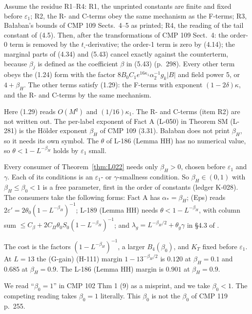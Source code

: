 \begin{theorem}\label{thm:L022}
Assume the residue R1--R4: R1, the unprinted constants are finite and fixed before $\varepsilon_1$; R2, the R- and C-terms obey the same mechanism as the F-terms; R3, Ba{\l}aban's bounds of CMP 109 Sects.~4--5 as printed; R4, the reading of the tail constant of (4.5). Then, after the transformations of CMP 109 Sect.~4: the order-0 term is removed by the $t_\square$-derivative; the order-1 term is zero by (4.14); the marginal parts of (4.34) and (5.43) cancel exactly against the counterterm, because $\beta_j$ is defined as the coefficient $\beta$ in (5.43) (p.~298). Every other term obeys the (1.24) form with the factor $8B_0C_1e^{16\kappa_1}\alpha_2^{-1}g_k|B|$ and field power 5, or $4+\beta_H$. The other terms satisfy (1.29): the F-terms with exponent $(1-2\delta)\kappa$, and the R- and C-terms by the same mechanism.
\end{theorem}
Here (1.29) reads $O(M^q)$ and $(1/16)\kappa_1$. The R- and C-terms (item R2) are not written out. The per-label exponent of Fact A (L-050) in Theorem SM (L-281) is the H\"older exponent $\beta_H$ of CMP 109 (3.31). Ba{\l}aban does not print $\beta_H$, so it needs its own symbol. The $\theta$ of L-186 (Lemma HH) has no numerical value, so $\theta<1-L^{-\beta_H}$ holds by $\varepsilon_1$ small.

\begin{proposition}\label{src:GGAIN-BETAH}
Every consumer of Theorem~\ref{thm:L022} needs only $\beta_H>0$, chosen before $\varepsilon_1$ and $\gamma$. Each of its conditions is an $\varepsilon_1$- or $\gamma$-smallness condition. So $\beta_H\in(0,1)$ with $\beta_H\le\beta_0<1$ is a free parameter, first in the order of constants (ledger K-028). The consumers take the following forms: Fact A has $\alpha_*=\beta_H$; (Eps) reads $2\varepsilon'=2\theta_0(1-L^{-\beta_H})^{-1}$; L-189 (Lemma HH) needs $\theta<1-L^{-\beta_H}$, with column sum $\le C_\beta+2C_\Pi\theta_0S_0(1-L^{-\beta_H})^{-1}$; and $\lambda_g=L^{-\beta_H/2}+\theta_g\gamma$ in \S4.3 of .
\end{proposition}
The cost is the factors $(1-L^{-\beta_H})^{-1}$, a larger $B_4(\beta_0)$, and $K_T$ fixed before $\varepsilon_1$. At $L=13$ the (G-gain) (H-111) margin $1-13^{-\beta_H/2}$ is $0.120$ at $\beta_H=0.1$ and $0.685$ at $\beta_H=0.9$. The L-186 (Lemma HH) margin is $0.901$ at $\beta_H=0.9$.
\begin{convention}\label{conv:src-beta0}
We read ``$\beta_0=1$'' in CMP 102 Thm 1 (9) as a misprint, and we take $\beta_0<1$. The competing reading takes $\beta_0=1$ literally. This $\beta_0$ is not the $\beta_0$ of CMP 119 p.~255.
\end{convention}

